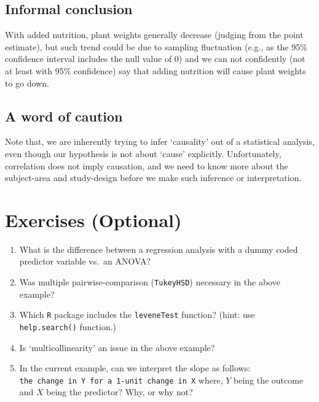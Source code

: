 \documentclass[
]{book}
\providecommand{\tightlist}{%
  \setlength{\itemsep}{0pt}\setlength{\parskip}{0pt}}
\begin{document}
\hypertarget{informal-conclusion}{%
\subsection{Informal conclusion}\label{informal-conclusion}}

With added nutrition, plant weights generally decrease (judging from the point estimate), but such trend could be due to sampling fluctuation (e.g., as the 95\% confidence interval includes the null value of 0) and we can not confidently (not at least with 95\% confidence) say that adding nutrition will cause plant weights to go down.

\hypertarget{a-word-of-caution}{%
\subsection{A word of caution}\label{a-word-of-caution}}

Note that, we are inherently trying to infer `causality' out of a statistical analysis, even though our hypothesis is not about `cause' explicitly. Unfortunately, correlation does not imply causation, and we need to know more about the subject-area and study-design before we make such inference or interpretation.

\hypertarget{exercises-optional}{%
\section{Exercises (Optional)}\label{exercises-optional}}

\begin{enumerate}
\def\labelenumi{\arabic{enumi}.}
\tightlist
\item
  What is the difference between a regression analysis with a dummy coded predictor variable vs.~an ANOVA?
\item
  Was multiple pairwise-comparison (\texttt{TukeyHSD}) necessary in the above example?\\
\item
  Which \texttt{R} package includes the \texttt{leveneTest} function? (hint: use \texttt{help.search()} function.)
\item
  Is `multicollinearity' an issue in the above example?
\item
  In the current example, can we interpret the slope as follows: \texttt{the\ change\ in\ Y\ for\ a\ 1-unit\ change\ in\ X} where, \(Y\) being the outcome and \(X\) being the predictor? Why, or why not?
\end{enumerate}
\end{document}
